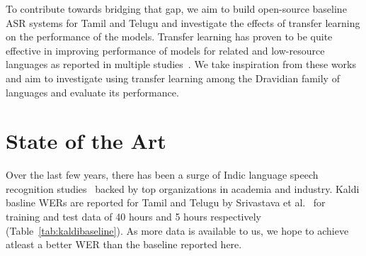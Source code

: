 \documentclass[11pt]{article} \usepackage{spconf,amsmath,graphicx}
\begin{document}


To contribute towards bridging that gap, we aim to build open-source baseline ASR systems for Tamil and Telugu and investigate the effects of transfer learning on the performance of the models.
Transfer learning has proven to be quite effective in improving performance of models for related and low-resource languages as reported in multiple studies~\cite{zoph2016transfer,nguyen2017transfer,li2019cantonese}.
We take inspiration from these works and  aim to investigate using transfer learning among the Dravidian family of languages and evaluate its performance.

\section{State of the Art}
Over the last few years, there has been a surge of Indic language speech recognition studies~\cite{srivastava2018interspeech,iitmasr,Multilingual} backed by top organizations in academia and industry.
Kaldi basline WERs are reported for Tamil and Telugu by Srivastava et al.~\cite{srivastava2018interspeech} for training and test data of 40 hours and 5 hours respectively (Table~\ref{tab:kaldibaseline}).
As more data is available to us, we hope to achieve atleast a better WER than the baseline reported here.
 
\end{document}
